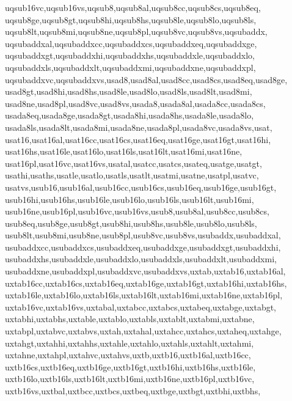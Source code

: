 {{      uqsub16vc,uqsub16vs,uqsub8,uqsub8al,uqsub8cc,uqsub8cs,uqsub8eq,         %
      uqsub8ge,uqsub8gt,uqsub8hi,uqsub8hs,uqsub8le,uqsub8lo,uqsub8ls,         %
      uqsub8lt,uqsub8mi,uqsub8ne,uqsub8pl,uqsub8vc,uqsub8vs,uqsubaddx,        %
      uqsubaddxal,uqsubaddxcc,uqsubaddxcs,uqsubaddxeq,uqsubaddxge,            %
      uqsubaddxgt,uqsubaddxhi,uqsubaddxhs,uqsubaddxle,uqsubaddxlo,            %
      uqsubaddxls,uqsubaddxlt,uqsubaddxmi,uqsubaddxne,uqsubaddxpl,            %
      uqsubaddxvc,uqsubaddxvs,usad8,usad8al,usad8cc,usad8cs,usad8eq,usad8ge,  %
      usad8gt,usad8hi,usad8hs,usad8le,usad8lo,usad8ls,usad8lt,usad8mi,        %
      usad8ne,usad8pl,usad8vc,usad8vs,usada8,usada8al,usada8cc,usada8cs,      %
      usada8eq,usada8ge,usada8gt,usada8hi,usada8hs,usada8le,usada8lo,         %
      usada8ls,usada8lt,usada8mi,usada8ne,usada8pl,usada8vc,usada8vs,usat,    %
      usat16,usat16al,usat16cc,usat16cs,usat16eq,usat16ge,usat16gt,usat16hi,  %
      usat16hs,usat16le,usat16lo,usat16ls,usat16lt,usat16mi,usat16ne,         %
      usat16pl,usat16vc,usat16vs,usatal,usatcc,usatcs,usateq,usatge,usatgt,   %
      usathi,usaths,usatle,usatlo,usatls,usatlt,usatmi,usatne,usatpl,usatvc,  %
      usatvs,usub16,usub16al,usub16cc,usub16cs,usub16eq,usub16ge,usub16gt,    %
      usub16hi,usub16hs,usub16le,usub16lo,usub16ls,usub16lt,usub16mi,         %
      usub16ne,usub16pl,usub16vc,usub16vs,usub8,usub8al,usub8cc,usub8cs,      %
      usub8eq,usub8ge,usub8gt,usub8hi,usub8hs,usub8le,usub8lo,usub8ls,        %
      usub8lt,usub8mi,usub8ne,usub8pl,usub8vc,usub8vs,usubaddx,usubaddxal,    %
      usubaddxcc,usubaddxcs,usubaddxeq,usubaddxge,usubaddxgt,usubaddxhi,      %
      usubaddxhs,usubaddxle,usubaddxlo,usubaddxls,usubaddxlt,usubaddxmi,      %
      usubaddxne,usubaddxpl,usubaddxvc,usubaddxvs,uxtab,uxtab16,uxtab16al,    %
      uxtab16cc,uxtab16cs,uxtab16eq,uxtab16ge,uxtab16gt,uxtab16hi,uxtab16hs,  %
      uxtab16le,uxtab16lo,uxtab16ls,uxtab16lt,uxtab16mi,uxtab16ne,uxtab16pl,  %
      uxtab16vc,uxtab16vs,uxtabal,uxtabcc,uxtabcs,uxtabeq,uxtabge,uxtabgt,    %
      uxtabhi,uxtabhs,uxtable,uxtablo,uxtabls,uxtablt,uxtabmi,uxtabne,        %
      uxtabpl,uxtabvc,uxtabvs,uxtah,uxtahal,uxtahcc,uxtahcs,uxtaheq,uxtahge,  %
      uxtahgt,uxtahhi,uxtahhs,uxtahle,uxtahlo,uxtahls,uxtahlt,uxtahmi,        %
      uxtahne,uxtahpl,uxtahvc,uxtahvs,uxtb,uxtb16,uxtb16al,uxtb16cc,          %
      uxtb16cs,uxtb16eq,uxtb16ge,uxtb16gt,uxtb16hi,uxtb16hs,uxtb16le,         %
      uxtb16lo,uxtb16ls,uxtb16lt,uxtb16mi,uxtb16ne,uxtb16pl,uxtb16vc,         %
      uxtb16vs,uxtbal,uxtbcc,uxtbcs,uxtbeq,uxtbge,uxtbgt,uxtbhi,uxtbhs,       %
}}
